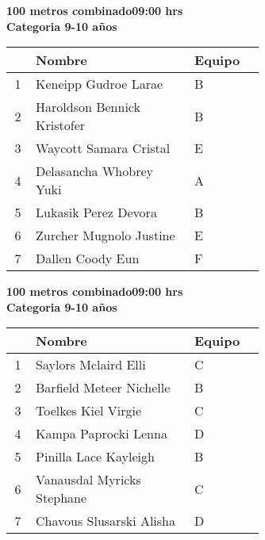 \begin{minipage}{0.95\linewidth}\vspace{0.5cm} 
\begin{flushleft}
\textbf{
\hspace{-0.15cm}100 metros combinado\hspace{1.5cm}09:00 hrs \\Categoria 9-10 años}\vspace{-0.2cm} 
\end{flushleft}
\begin{tabular}{cp{0.63\linewidth}l}
\hline
& \textbf{Nombre} & \textbf{Equipo} \\ \hline
1 & Keneipp Gudroe Larae & B \\ 
2 & Haroldson Bennick Kristofer & B \\ 
3 & Waycott Samara Cristal & E \\ 
4 & Delasancha Whobrey Yuki & A \\ 
5 & Lukasik Perez Devora & B \\ 
6 & Zurcher Mugnolo Justine & E \\ 
7 & Dallen Coody Eun & F \\ 
\end{tabular}
\end{minipage}
\begin{minipage}{0.95\linewidth}\vspace{0.5cm} 
\begin{flushleft}
\textbf{
\hspace{-0.15cm}100 metros combinado\hspace{1.5cm}09:00 hrs \\Categoria 9-10 años}\vspace{-0.2cm} 
\end{flushleft}
\begin{tabular}{cp{0.63\linewidth}l}
\hline
& \textbf{Nombre} & \textbf{Equipo} \\ \hline
1 & Saylors Mclaird Elli & C \\ 
2 & Barfield Meteer Nichelle & B \\ 
3 & Toelkes Kiel Virgie & C \\ 
4 & Kampa Paprocki Lenna & D \\ 
5 & Pinilla Lace Kayleigh & B \\ 
6 & Vanausdal Myricks Stephane & C \\ 
7 & Chavous Slusarski Alisha & D \\ 
\end{tabular}
\end{minipage}
